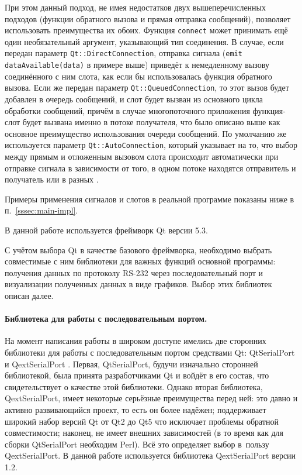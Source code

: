 \documentclass[a4paper, 14pt, titlepage]{extarticle}
\newcommand{\inlinecode}[1]{\lstinline[basicstyle=\ttfamily]{#1}}
\begin{document}
  При этом данный подход, не имея недостатков двух вышеперечисленных подходов (функции обратного
  вызова и прямая отправка сообщений), позволяет использовать преимущества их обоих. Функция
  \inlinecode{connect} может принимать ещё один необязательный аргумент, указывающий тип соединения.
  В случае, если передан параметр \inlinecode{Qt::DirectConnection}, отправка сигнала
  (\inlinecode{emit dataAvailable(data)} в примере выше) приведёт к немедленному вызову соединённого
  с ним слота, как если бы использовалась функция обратного вызова.  Если же передан параметр
  \inlinecode{Qt::QueuedConnection}, то этот вызов будет добавлен в очередь сообщений, и слот будет
  вызван из основного цикла обработки сообщений, причём в случае многопоточного приложения
  функция-слот будет вызвана именно в потоке получателя, что было описано выше как основное
  преимущество использования очереди сообщений. По умолчанию же используется параметр
  \inlinecode{Qt::AutoConnection}, который указывает на то, что выбор между прямым и отложенным
  вызовом слота происходит автоматически при отправке сигнала в зависимости от того, в одном
  потоке находятся отправитель и получатель или в разных \cite{qt-connection-type}.

  Примеры применения сигналов и слотов в реальной программе показаны ниже в п.~\ref{sssec:main-impl}.

  В данной работе используется фреймворк Qt версии 5.3.

  С учётом выбора Qt в качестве базового фреймворка, необходимо выбрать совместимые с ним библиотеки
  для важных функций основной программы: получения данных по протоколу RS-232 через последовательный
  порт и визуализации полученных данных в виде графиков. Выбор этих библиотек описан далее.

  \paragraph{Библиотека для работы с последовательным портом.}
  На момент написания работы в широком доступе имелись две сторонних библиотеки для работы с
  последовательным портом средствами Qt: QtSerialPort \cite{qtserialport} и QextSerialPort \cite{qextserialport}.
  Первая, QtSerialPort, будучи изначально сторонней библиотекой, была принята разработчиками Qt и
  войдёт в его состав, что свидетельствует о качестве этой библиотеки. Однако вторая
  библиотека, QextSerialPort, имеет некоторые серьёзные преимущества перед ней: это давно и активно
  развивающийся проект, то есть он более надёжен; поддерживает широкий набор версий Qt от Qt2 до Qt5
  что исключает проблемы обратной совместимости; наконец, не имеет внешних зависимостей (в то время
  как для сборки QtSerialPort необходим Perl). Всё это определяет выбор в~пользу QextSerialPort.
  В данной работе используется библиотека QextSerialPort версии 1.2.
\end{document}

